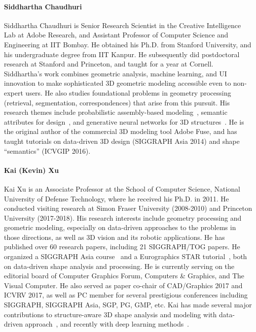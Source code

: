 \documentclass{egpubl}
\begin{document}
\paragraph*{Siddhartha Chaudhuri}
Siddhartha Chaudhuri is Senior Research Scientist in the Creative Intelligence Lab at Adobe Research, and Assistant Professor of Computer Science and Engineering at IIT Bombay. He obtained his Ph.D. from Stanford University, and his undergraduate degree from IIT Kanpur. He subsequently did postdoctoral research at Stanford and Princeton, and taught for a year at Cornell. Siddhartha's work combines geometric analysis, machine learning, and UI innovation to make sophisticated 3D geometric modeling accessible even to non-expert users. He also studies foundational problems in geometry processing (retrieval, segmentation, correspondences) that arise from this pursuit. His research themes include probabilistic assembly-based modeling~\cite{Chaudhuri2011,Kalogerakis2012,Kim2013,Sung2017}, semantic attributes for design~\cite{Chaudhuri2013,Yumer2015}, and generative neural networks for 3D structures~\cite{li2017grass,zhu2018scores,Li2018}. He is the original author of the commercial 3D modeling tool Adobe Fuse, and has taught tutorials on data-driven 3D design (\mbox{SIGGRAPH} Asia 2014) and shape ``semantics'' (\mbox{ICVGIP} 2016).

\paragraph*{Kai (Kevin) Xu}
Kai Xu is an Associate Professor at the School of Computer Science, National University of Defense Technology, where he received his Ph.D. in 2011. He conducted visiting research at Simon Fraser University (2008-2010) and Princeton University (2017-2018). His research interests include geometry processing and geometric modeling, especially on data-driven approaches to the problems in those directions, as well as 3D vision and its robotic applications. He has published over 60 research papers, including 21 SIGGRAPH/TOG papers. He organized a SIGGRAPH Asia course~\cite{xu2017data} and a Eurographics STAR tutorial~\cite{xu2016data}, both on data-driven shape analysis and processing. He is currently serving on the editorial board of Computer Graphics Forum, Computers \& Graphics, and The Visual Computer. He also served as paper co-chair of CAD/Graphics 2017 and ICVRV 2017, as well as PC member for several prestigious conferences including SIGGRAPH, SIGGRAPH Asia, SGP, PG, GMP, etc. Kai has made several major contributions to structure-aware 3D shape analysis and modeling with data-driven approach~\cite{xu2010style,xu2011photo,xu2012fit,van2013co}, and recently with deep learning methods~\cite{li2017grass,li2018grains,zhu2018scores}.
\end{document}
